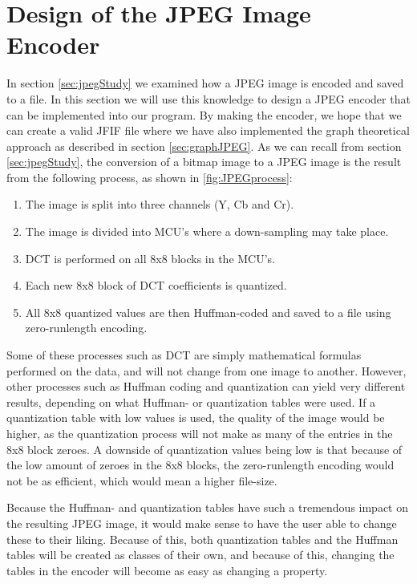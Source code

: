 \section{Design of the JPEG Image Encoder}
\label{sec:designJPEG}
In section \ref{sec:jpegStudy} we examined how a JPEG image is encoded and saved to a file.
In this section we will use this knowledge to design a JPEG encoder that can be implemented into our program.
By making the encoder, we hope that we can create a valid JFIF file where we have also implemented the graph theoretical approach as described in section \ref{sec:graphJPEG}.
As we can recall from section \ref{sec:jpegStudy}, the conversion of a bitmap image to a JPEG image is the result from the following process, as shown in \ref{fig:JPEGprocess}:

\begin{enumerate}
	\item The image is split into three channels (Y, Cb and Cr).
	\item The image is divided into MCU's where a down-sampling may take place.
	\item DCT is performed on all 8x8 blocks in the MCU's.
	\item Each new 8x8 block of DCT coefficients is quantized.
	\item All 8x8 quantized values are then Huffman-coded and saved to a file using zero-runlength encoding.
\end{enumerate}

Some of these processes such as DCT are simply mathematical formulas performed on the data, and will not change from one image to another.
However, other processes such as Huffman coding and quantization can yield very different results, depending on what Huffman- or quantization tables were used.
If a quantization table with low values is used, the quality of the image would be higher, as the quantization process will not make as many of the entries in the 8x8 block zeroes.
A downside of quantization values being low is that because of the low amount of zeroes in the 8x8 blocks, the zero-runlength encoding would not be as efficient, which would mean a higher file-size.

Because the Huffman- and quantization tables have such a tremendous impact on the resulting JPEG image, it would make sense to have the user able to change these to their liking.
Because of this, both quantization tables and the Huffman tables will be created as classes of their own, and because of this, changing the tables in the encoder will become as easy as changing a property.

